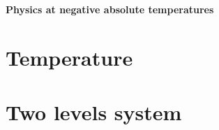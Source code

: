 \documentclass[]{article}
\begin{document}
\centerline{\bfseries\LARGE Physics at negative absolute temperatures}

\section{Temperature}


\section{Two levels system}


\end{document}
